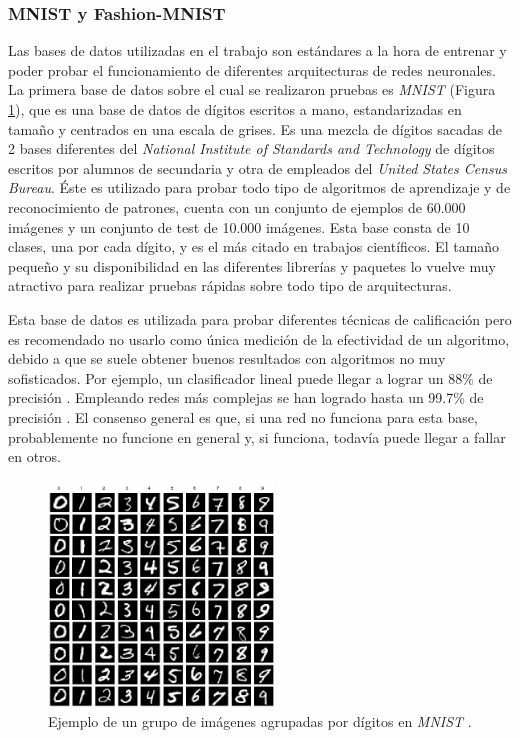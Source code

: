 \documentclass[spanish]{article}
\theoremstyle{definition}
\theoremstyle{remark}
\numberwithin{equation}{section}
\numberwithin{equation}{section} %
\begin{document}
\subsubsection{ MNIST y Fashion-MNIST}
Las bases de datos utilizadas en el trabajo son estándares a la hora de entrenar y poder probar el funcionamiento de diferentes arquitecturas de redes neuronales. La primera base de datos sobre el cual se realizaron pruebas es \textit{MNIST} \cite{lecun-mnisthandwrittendigit-2010} (Figura \ref{fig:MNIST}), que es una base de datos de dígitos escritos a mano, estandarizadas en tamaño y centrados en una escala de grises. Es una mezcla de dígitos sacadas de 2 bases diferentes del \textit{National Institute of Standards and Technology} de dígitos escritos por alumnos de secundaria y otra de empleados del \textit{United States Census Bureau}. Éste es utilizado para probar todo tipo de algoritmos de aprendizaje y de reconocimiento de patrones, cuenta con un conjunto de ejemplos de 60.000 imágenes y un conjunto de test de 10.000 imágenes. Esta base consta de 10 clases, una por cada dígito, y es el más citado en trabajos científicos. El tamaño pequeño y su disponibilidad en las diferentes librerías y paquetes lo vuelve muy atractivo para realizar pruebas rápidas sobre todo tipo de arquitecturas. \par
Esta base de datos es utilizada para probar diferentes técnicas de calificación pero es recomendado no usarlo como única medición de la efectividad de un algoritmo, debido a que se suele obtener buenos resultados con algoritmos no muy sofisticados. Por ejemplo, un clasificador lineal puede llegar a lograr un 88\% de precisión \cite{lecun1998gradient,lecun-mnisthandwrittendigit-2010}. Empleando redes más complejas se han logrado hasta un 99.7\% de precisión \cite{wan2013regularization,cirecsan2012multi}. El consenso general es que, si una red no funciona para esta base, probablemente no funcione en general y, si funciona, todavía puede llegar a fallar en otros. \par
\begin{figure}[H]
 \centering
 \includegraphics[width=6cm]{img/ejemplo_MNIST.png}
\caption[Ejemplo MNIST]{\footnotesize{ Ejemplo de un grupo de imágenes agrupadas por dígitos en \textit{MNIST} \cite{lecun-mnisthandwrittendigit-2010}.}}
\label{fig:MNIST}
\end{figure}
\end{document}
